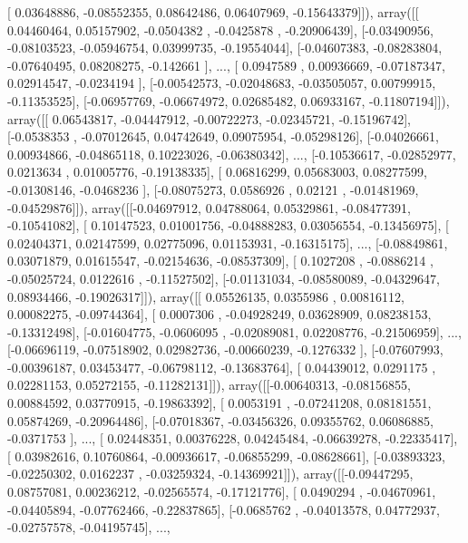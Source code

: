 \documentclass{article}
\begin{document}
       [ 0.03648886, -0.08552355,  0.08642486,  0.06407969, -0.15643379]]), array([[ 0.04460464,  0.05157902, -0.0504382 , -0.0425878 , -0.20906439],
       [-0.03490956, -0.08103523, -0.05946754,  0.03999735, -0.19554044],
       [-0.04607383, -0.08283804, -0.07640495,  0.08208275, -0.142661  ],
       ..., 
       [ 0.0947589 ,  0.00936669, -0.07187347,  0.02914547, -0.0234194 ],
       [-0.00542573, -0.02048683, -0.03505057,  0.00799915, -0.11353525],
       [-0.06957769, -0.06674972,  0.02685482,  0.06933167, -0.11807194]]), array([[ 0.06543817, -0.04447912, -0.00722273, -0.02345721, -0.15196742],
       [-0.0538353 , -0.07012645,  0.04742649,  0.09075954, -0.05298126],
       [-0.04026661,  0.00934866, -0.04865118,  0.10223026, -0.06380342],
       ..., 
       [-0.10536617, -0.02852977,  0.0213634 ,  0.01005776, -0.19138335],
       [ 0.06816299,  0.05683003,  0.08277599, -0.01308146, -0.0468236 ],
       [-0.08075273,  0.0586926 ,  0.02121   , -0.01481969, -0.04529876]]), array([[-0.04697912,  0.04788064,  0.05329861, -0.08477391, -0.10541082],
       [ 0.10147523,  0.01001756, -0.04888283,  0.03056554, -0.13456975],
       [ 0.02404371,  0.02147599,  0.02775096,  0.01153931, -0.16315175],
       ..., 
       [-0.08849861,  0.03071879,  0.01615547, -0.02154636, -0.08537309],
       [ 0.1027208 , -0.0886214 , -0.05025724,  0.0122616 , -0.11527502],
       [-0.01131034, -0.08580089, -0.04329647,  0.08934466, -0.19026317]]), array([[ 0.05526135,  0.0355986 ,  0.00816112,  0.00082275, -0.09744364],
       [ 0.0007306 , -0.04928249,  0.03628909,  0.08238153, -0.13312498],
       [-0.01604775, -0.0606095 , -0.02089081,  0.02208776, -0.21506959],
       ..., 
       [-0.06696119, -0.07518902,  0.02982736, -0.00660239, -0.1276332 ],
       [-0.07607993, -0.00396187,  0.03453477, -0.06798112, -0.13683764],
       [ 0.04439012,  0.0291175 ,  0.02281153,  0.05272155, -0.11282131]]), array([[-0.00640313, -0.08156855,  0.00884592,  0.03770915, -0.19863392],
       [ 0.0053191 , -0.07241208,  0.08181551,  0.05874269, -0.20964486],
       [-0.07018367, -0.03456326,  0.09355762,  0.06086885, -0.0371753 ],
       ..., 
       [ 0.02448351,  0.00376228,  0.04245484, -0.06639278, -0.22335417],
       [ 0.03982616,  0.10760864, -0.00936617, -0.06855299, -0.08628661],
       [-0.03893323, -0.02250302,  0.0162237 , -0.03259324, -0.14369921]]), array([[-0.09447295,  0.08757081,  0.00236212, -0.02565574, -0.17121776],
       [ 0.0490294 , -0.04670961, -0.04405894, -0.07762466, -0.22837865],
       [-0.0685762 , -0.04013578,  0.04772937, -0.02757578, -0.04195745],
       ..., 
\end{document}
